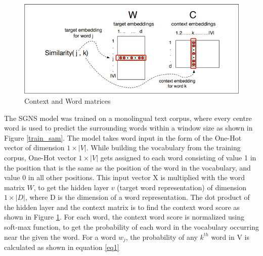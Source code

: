 \documentclass[12pt]{report} %
\begin{document}

\begin{figure}[h]
	\centering
	\includegraphics[scale=0.50]{image/cbows.png}
	\caption{Context and Word matrices \citep{jurafsky2014speech}}
	\label{C_W_matrics}
\end{figure}


The SGNS model was trained on a monolingual text corpus, where every centre word is used to predict the surrounding words within a window size as shown in Figure \ref{train_sam}.
The model takes word input in the form of the One-Hot vector of dimension $1\times|V|$. While building the vocabulary from the training corpus, One-Hot vector $1\times|V|$ gets assigned to each word consisting of value 1 in the position that is the same as the position of the word in the vocabulary, and value 0 in all other positions. This input vector X is multiplied with the word matrix $W$, to get the hidden layer $v$ (target word representation) of dimension $1\times|D|$, where D is the dimension of a word representation. The dot product of the hidden layer and the context matrix is to find the context word score as shown in Figure \ref{C_W_matrics}. For each word, the context word score is normalized using soft-max function, to get the probability of each word in the vocabulary occurring near the given the word. For a word $w_{j}$, the probability of any $k^{th}$ word in V is calculated as shown in equation \ref{eq1}
\end{document}

